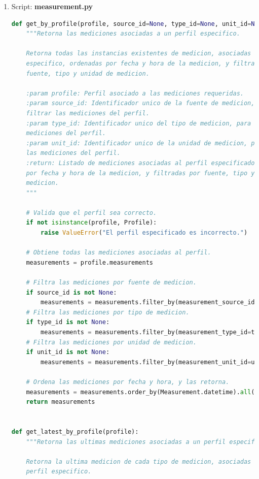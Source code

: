 \begin{enumerate}

\item Script: \textbf{measurement.py}

\begin{lstlisting}[language=Python]
def get_by_profile(profile, source_id=None, type_id=None, unit_id=None):
    """Retorna las mediciones asociadas a un perfil especifico.

    Retorna todas las instancias existentes de medicion, asociadas a un perfil
    especifico, ordenadas por fecha y hora de la medicion, y filtradas por
    fuente, tipo y unidad de medicion.

    :param profile: Perfil asociado a las mediciones requeridas.
    :param source_id: Identificador unico de la fuente de medicion, para
    filtrar las mediciones del perfil.
    :param type_id: Identificador unico del tipo de medicion, para filtrar las
    mediciones del perfil.
    :param unit_id: Identificador unico de la unidad de medicion, para filtrar
    las mediciones del perfil.
    :return: Listado de mediciones asociadas al perfil especificado, ordenado
    por fecha y hora de la medicion, y filtradas por fuente, tipo y unidad de
    medicion.
    """

    # Valida que el perfil sea correcto.
    if not isinstance(profile, Profile):
        raise ValueError("El perfil especificado es incorrecto.")

    # Obtiene todas las mediciones asociadas al perfil.
    measurements = profile.measurements

    # Filtra las mediciones por fuente de medicion.
    if source_id is not None:
        measurements = measurements.filter_by(measurement_source_id=source_id)
    # Filtra las mediciones por tipo de medicion.
    if type_id is not None:
        measurements = measurements.filter_by(measurement_type_id=type_id)
    # Filtra las mediciones por unidad de medicion.
    if unit_id is not None:
        measurements = measurements.filter_by(measurement_unit_id=unit_id)

    # Ordena las mediciones por fecha y hora, y las retorna.
    measurements = measurements.order_by(Measurement.datetime).all()
    return measurements


def get_latest_by_profile(profile):
    """Retorna las ultimas mediciones asociadas a un perfil especifico.

    Retorna la ultima medicion de cada tipo de medicion, asociadas a un
    perfil especifico.


\end{lstlisting}
\end{enumerate}
